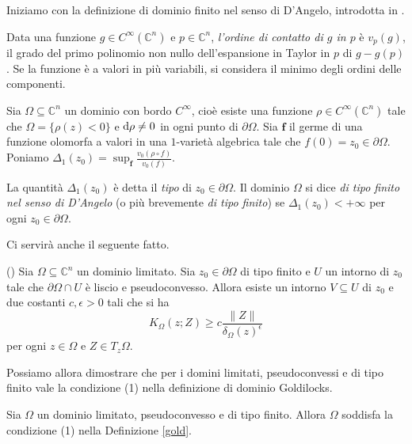 Iniziamo con la definizione di dominio finito nel senso di D'Angelo, introdotta in \cite{D'A}.

\begin{defn}
    Data una funzione $g\in C^\infty(\mathbb{C}^n)$ e $p\in\mathbb{C}^n$, \textit{l'ordine di contatto di $g$ in $p$} è $v_p(g)$, il grado del primo polinomio non nullo dell'espansione in Taylor in $p$ di $g-g(p)$. Se la funzione è a valori in più variabili, si considera il minimo degli ordini delle componenti.

    Sia $\Omega\subseteq\mathbb{C}^n$ un dominio con bordo $C^\infty$, cioè esiste una funzione $\rho\in C^\infty(\mathbb{C}^n)$ tale che $\Omega=\{\rho(z)<0\}$ e $\mathop{}\!\mathrm{d}\rho\not=0$ in ogni punto di $\partial\Omega$. Sia $\textbf{f}$ il germe di una funzione olomorfa a valori in una $1$-varietà algebrica tale che $f(0)=z_0\in\partial\Omega$. Poniamo $\Delta_1(z_0)=\displaystyle\sup_{\textbf{f}} \frac{v_0(\rho\circ f)}{v_0(f)}$.

    La quantità $\Delta_1(z_0)$ è detta il \textit{tipo} di $z_0\in\partial\Omega$. Il dominio $\Omega$ si dice \textit{di tipo finito nel senso di D'Angelo} (o più brevemente \textit{di tipo finito}) se $\Delta_1(z_0)<+\infty$ per ogni $z_0\in\partial\Omega$.
\end{defn}

Ci servirà anche il seguente fatto.

\begin{thm} \label{cho}
    (\cite[Theorem 1]{C}) Sia $\Omega\subseteq\mathbb{C}^n$ un dominio limitato. Sia $z_0\in\partial\Omega$ di tipo finito e $U$ un intorno di $z_0$ tale che $\partial\Omega\cap U$ è liscio e pseudoconvesso. Allora esiste un intorno $V\subseteq U$ di $z_0$ e due costanti $c,\epsilon>0$ tali che si ha
    $$K_\Omega(z;Z) \ge c\frac{\|Z\|}{\delta_\Omega(z)^\epsilon}$$
    per ogni $z\in\Omega$ e $Z\in T_z\Omega$.
\end{thm}

Possiamo allora dimostrare che per i domini limitati, pseudoconvessi e di tipo finito vale la condizione (1) nella definizione di dominio Goldilocks.

\begin{cor}
    Sia $\Omega$ un dominio limitato, pseudoconvesso e di tipo finito. Allora $\Omega$ soddisfa la condizione (1) nella Definizione \ref{gold}.
\end{cor}

